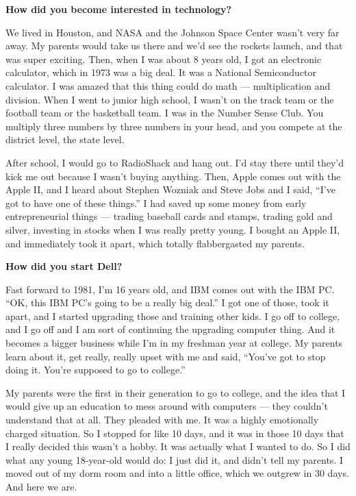 \textbf{How did you become interested in technology?}

We lived in Houston, and NASA and the Johnson Space Center wasn't very
far away. My parents would take us there and we'd see the rockets
launch, and that was super exciting. Then, when I was about 8 years old,
I got an electronic calculator, which in 1973 was a big deal. It was a
National Semiconductor calculator. I was amazed that this thing could do
math --- multiplication and division. When I went to junior high school,
I wasn't on the track team or the football team or the basketball team.
I was in the Number Sense Club. You multiply three numbers by three
numbers in your head, and you compete at the district level, the state
level.

After school, I would go to RadioShack and hang out. I'd stay there
until they'd kick me out because I wasn't buying anything. Then, Apple
comes out with the Apple II, and I heard about Stephen Wozniak and Steve
Jobs and I said, ``I've got to have one of these things.'' I had saved
up some money from early entrepreneurial things --- trading baseball
cards and stamps, trading gold and silver, investing in stocks when I
was really pretty young. I bought an Apple II, and immediately took it
apart, which totally flabbergasted my parents.

\textbf{How did you start Dell?}

Fast forward to 1981, I'm 16 years old, and IBM comes out with the IBM
PC. ``OK, this IBM PC's going to be a really big deal.'' I got one of
those, took it apart, and I started upgrading those and training other
kids. I go off to college, and I go off and I am sort of continuing the
upgrading computer thing. And it becomes a bigger business while I'm in
my freshman year at college. My parents learn about it, get really,
really upset with me and said, ``You've got to stop doing it. You're
supposed to go to college.''

My parents were the first in their generation to go to college, and the
idea that I would give up an education to mess around with computers ---
they couldn't understand that at all. They pleaded with me. It was a
highly emotionally charged situation. So I stopped for like 10 days, and
it was in those 10 days that I really decided this wasn't a hobby. It
was actually what I wanted to do. So I did what any young 18-year-old
would do: I just did it, and didn't tell my parents. I moved out of my
dorm room and into a little office, which we outgrew in 30 days. And
here we are.

